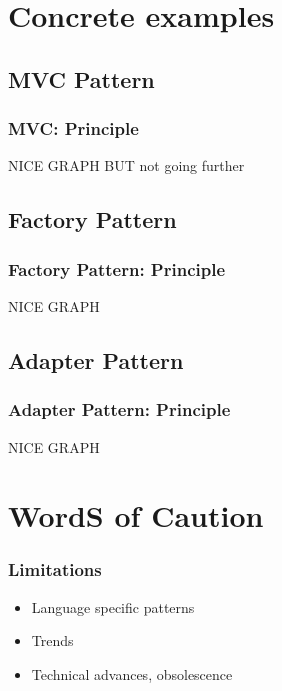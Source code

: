 \documentclass{beamer}
\begin{document}
\section{Concrete examples}

\subsection{MVC Pattern}
\begin{frame}
\frametitle{MVC: Principle}
NICE GRAPH BUT not going further
\end{frame} 

\subsection{Factory Pattern}
\begin{frame}
\frametitle{Factory Pattern: Principle}
NICE GRAPH
\end{frame} 


\subsection{Adapter Pattern}
\begin{frame}
\frametitle{Adapter Pattern: Principle}
NICE GRAPH
\end{frame} 




\section{WordS of Caution}
\begin{frame}
 \frametitle{Limitations}
\begin{itemize}
 \item Language specific patterns
 \item Trends
 \item Technical advances, obsolescence
\end{itemize}
\end{frame}
\end{document}
